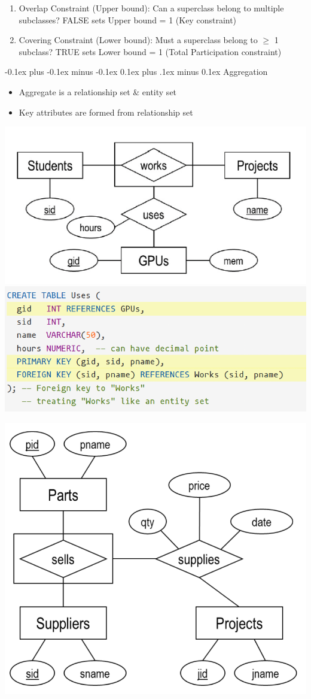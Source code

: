 \documentclass[landscape]{article}
\makeatletter
\renewcommand{\subsection}{\@startsection{subsection}{2}{0mm}%
  {-0.1ex plus -0.1ex minus -0.1ex}%
  {0.1ex plus .1ex minus 0.1ex}%
{\normalfont\scriptsize\bfseries}}
\makeatother
\begin{document}
\begin{multicols*}{5}
\begin{itemize}
\begin{multicols}{2}
        \columnbreak
        \begin{enumerate}
          \item Overlap Constraint (Upper bound): Can a superclass belong to multiple subclasses? FALSE sets Upper bound = 1 (Key constraint)
          \item Covering Constraint (Lower bound): Must a superclass belong to $\geq$ 1 subclass? TRUE sets Lower bound = 1 (Total Participation constraint)
        \end{enumerate}
      \end{multicols}
    \end{itemize}

    \subsection{Aggregation}
    \begin{itemize}
      \item Aggregate is a relationship set \& entity set
      \item Key attributes are formed from relationship set
    \end{itemize}
    \includegraphics[width=0.55\linewidth]{10_aggregate_diagram.png}
    \includegraphics[width=0.75\linewidth]{11_aggregate_schema.png}
    \begin{multicols}{2}
      \includegraphics[width=0.8\linewidth]{12_aggregate_example.png}

\end{multicols}
\end{multicols*}
\end{document}
